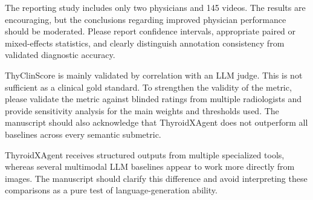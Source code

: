 \label{rev:R3.4}
\begin{reviewercomment}
The reporting study includes only two physicians and 145 videos. The results are encouraging, but the conclusions regarding improved physician performance should be moderated. Please report confidence intervals, appropriate paired or mixed-effects statistics, and clearly distinguish annotation consistency from validated diagnostic accuracy.
\end{reviewercomment}
\begin{authorresponse}

\end{authorresponse}

\label{rev:R3.5}
\begin{reviewercomment}
ThyClinScore is mainly validated by correlation with an LLM judge. This is not sufficient as a clinical gold standard. To strengthen the validity of the metric, please validate the metric against blinded ratings from multiple radiologists and provide sensitivity analysis for the main weights and thresholds used. The manuscript should also acknowledge that ThyroidXAgent does not outperform all baselines across every semantic submetric.
\end{reviewercomment}
\begin{authorresponse}

\end{authorresponse}

\label{rev:R3.M1}
\begin{reviewercomment}
ThyroidXAgent receives structured outputs from multiple specialized tools, whereas several multimodal LLM baselines appear to work more directly from images. The manuscript should clarify this difference and avoid interpreting these comparisons as a pure test of language-generation ability.
\end{reviewercomment}
\begin{authorresponse}

\end{authorresponse}
\responseappendixheading


